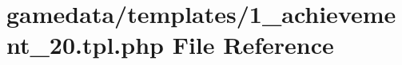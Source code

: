 \hypertarget{1__achievement__20_8tpl_8php}{\section{gamedata/templates/1\+\_\+achievement\+\_\+20.tpl.\+php File Reference}
\label{1__achievement__20_8tpl_8php}
}
